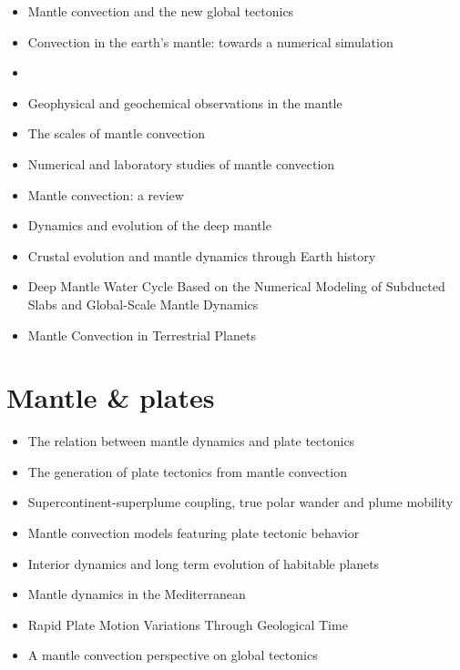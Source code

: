    \begin{itemize}
   \item [1972] Mantle convection and the new global tectonics \cite{tuox72}
   \item [\nineteenseventyfour] Convection in the earth’s mantle: towards a numerical simulation \cite{mcrw74}
   \item [1983] 
   \item [\nineteenninetytwo] Geophysical and geochemical observations in the mantle \cite{dari92}
   \item [\nineteenninetyeight] The scales of mantle convection \cite{ande98}
   \item [\twothousandfive] Numerical and laboratory studies of mantle convection \cite{taxn05}
   \item [\twothousandeight] Mantle convection: a review \cite{ogaw08}
   \item [\twothousandtwelve] Dynamics and evolution of the deep mantle  \cite{tack12}
   \item [\twothousandeighteen] Crustal evolution and mantle dynamics through Earth history \cite{kore18}
   \item [\twothousandnineteen] Deep Mantle Water Cycle Based on the Numerical Modeling of Subducted Slabs and Global-Scale Mantle Dynamics \cite{nana19}
   \item [\twothousandtwenty] Mantle Convection in Terrestrial Planets \cite{mube20}
   \end{itemize}

\section{Mantle \& plates}

   \begin{itemize}
   \item [\twothousand] The relation between mantle dynamics and plate tectonics \cite{berr00} 
   \item [\twothousandthree] The generation of plate tectonics from mantle convection \cite{berc03}
   \item [\twothousandnine] Supercontinent-superplume coupling, true polar wander and plume mobility \cite{lizh09}
   \item [\twothousandeleven] Mantle convection models featuring plate tectonic behavior \cite{lowm11}
   \item [\twothousandtwelve] Interior dynamics and long term evolution of habitable planets \cite{taab12}
   \item [\twothousandfourteen] Mantle dynamics in the Mediterranean \cite{faba14}
   \item [\twothousandfifteen] Rapid Plate Motion Variations Through Geological Time \cite{iabu15}
   \item [\twothousandseventeen] A mantle convection perspective on global tectonics \cite{cogu17}
   \end{itemize}

